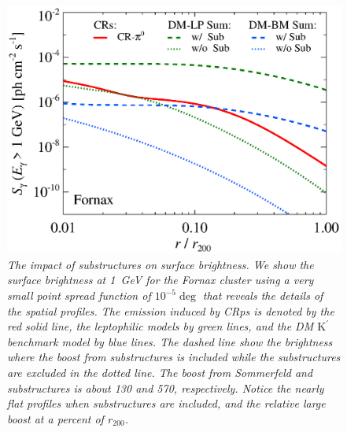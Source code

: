 \documentclass[10pt,aps,pra,reprint,amsmath,amsfonts,amssymb,showpacs]{revtex4-1}
\newcommand{\rmn}{\mathrm}
\newcommand{\Kp}{\rmn{K}^\prime}
\newcommand{\rvir}{r_{200}}
\begin{document}
\begin{figure}%
 \includegraphics[width=0.99\columnwidth]{figures/SB.resolved.v10.1GeV.SF300.noSuB.vs.SubMass.elmu.eps}
\caption{\it The impact of substructures on surface brightness. We
  show the surface brightness at 1~GeV for the Fornax cluster using a
  very small point spread function of $10^{-5}\deg$ that reveals the
  details of the spatial profiles. The emission induced by CRps is
  denoted by the red solid line, the leptophilic models by green
  lines, and the DM $\Kp$ benchmark model by blue lines. The dashed
  line show the brightness where the boost from substructures is
  included while the substructures are excluded in the dotted
  line. The boost from Sommerfeld and substructures is about 130 and
  570, respectively. Notice the nearly flat profiles when
  substructures are included, and the relative large boost at a
  percent of $\rvir$.}
 \label{fig:SB_sub}
\end{figure}
\end{document}
